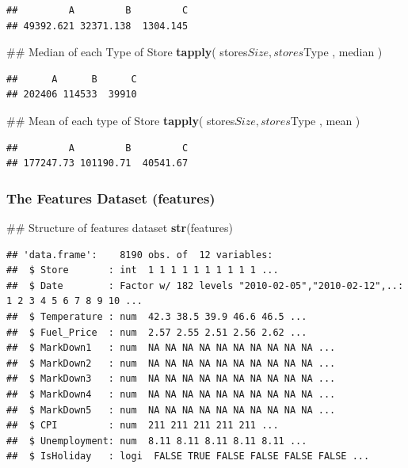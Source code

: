 \documentclass[]{article}
\newenvironment{Shaded}{\begin{snugshade}}{\end{snugshade}}
\newcommand{\KeywordTok}[1]{\textcolor[rgb]{0.13,0.29,0.53}{\textbf{{#1}}}}
\newcommand{\NormalTok}[1]{{#1}}
\begin{document}
\begin{verbatim}
##         A         B         C 
## 49392.621 32371.138  1304.145
\end{verbatim}

\begin{Shaded}
\begin{Highlighting}[]
\NormalTok{## Median of each Type of Store}
\KeywordTok{tapply}\NormalTok{( stores$Size , stores$Type , median )}
\end{Highlighting}
\end{Shaded}

\begin{verbatim}
##      A      B      C 
## 202406 114533  39910
\end{verbatim}

\begin{Shaded}
\begin{Highlighting}[]
\NormalTok{## Mean of each type of Store}
\KeywordTok{tapply}\NormalTok{( stores$Size , stores$Type , mean )}
\end{Highlighting}
\end{Shaded}

\begin{verbatim}
##         A         B         C 
## 177247.73 101190.71  40541.67
\end{verbatim}

\subsubsection{The Features Dataset
(features)}\label{the-features-dataset-features}

\begin{Shaded}
\begin{Highlighting}[]
\NormalTok{## Structure of features dataset}
\KeywordTok{str}\NormalTok{(features)}
\end{Highlighting}
\end{Shaded}

\begin{verbatim}
## 'data.frame':    8190 obs. of  12 variables:
##  $ Store       : int  1 1 1 1 1 1 1 1 1 1 ...
##  $ Date        : Factor w/ 182 levels "2010-02-05","2010-02-12",..: 1 2 3 4 5 6 7 8 9 10 ...
##  $ Temperature : num  42.3 38.5 39.9 46.6 46.5 ...
##  $ Fuel_Price  : num  2.57 2.55 2.51 2.56 2.62 ...
##  $ MarkDown1   : num  NA NA NA NA NA NA NA NA NA NA ...
##  $ MarkDown2   : num  NA NA NA NA NA NA NA NA NA NA ...
##  $ MarkDown3   : num  NA NA NA NA NA NA NA NA NA NA ...
##  $ MarkDown4   : num  NA NA NA NA NA NA NA NA NA NA ...
##  $ MarkDown5   : num  NA NA NA NA NA NA NA NA NA NA ...
##  $ CPI         : num  211 211 211 211 211 ...
##  $ Unemployment: num  8.11 8.11 8.11 8.11 8.11 ...
##  $ IsHoliday   : logi  FALSE TRUE FALSE FALSE FALSE FALSE ...
\end{verbatim}
\end{document}
